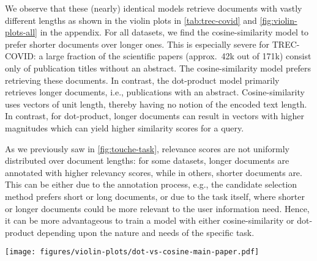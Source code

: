\documentclass[11pt]{article}
\begin{document}
We observe that these (nearly) identical models retrieve documents with vastly different lengths as shown in the violin plots in \autoref{tab:trec-covid} and \autoref{fig:violin-plots-all} in the appendix. For all datasets, we find the cosine-similarity model to prefer shorter documents over longer ones. This is especially severe for TREC-COVID: a large fraction of the scientific papers (approx.~42k out of 171k) consist only of publication titles without an abstract. The cosine-similarity model prefers retrieving these documents. In contrast, the dot-product model primarily retrieves longer documents, i.e., publications with an abstract. Cosine-similarity uses vectors of unit length, thereby having no notion of the encoded text length. In contrast, for dot-product, longer documents can result in vectors with higher magnitudes which can yield higher similarity scores for a query.

As we previously saw in \autoref{fig:touche-task}, relevance scores are not uniformly distributed over document lengths: for some datasets, longer documents are annotated with higher relevancy scores, while in others, shorter documents are. This can be either due to the annotation process, e.g., the candidate selection method prefers short or long documents, or due to the task itself, where shorter or longer documents could be more relevant to the user information need. Hence, it can be more advantageous to train a model with either cosine-similarity or dot-product depending upon the nature and needs of the specific task.


\begin{table}[htb!]
    \small
    \texttt{[image: figures/violin-plots/dot-vs-cosine-main-paper.pdf]}
    \caption{Violin plots \cite{citeulike:4075875} of document lengths for the top-10 retrieved hits and nDCG@10 scores using SBERT (\autoref{sec:sbert_model}) model trained with either cosine similarity (blue, top) or dot product (orange, bottom).}
    \label{tab:trec-covid}
    \vspace*{-\baselineskip}
\end{table}
\end{document}
